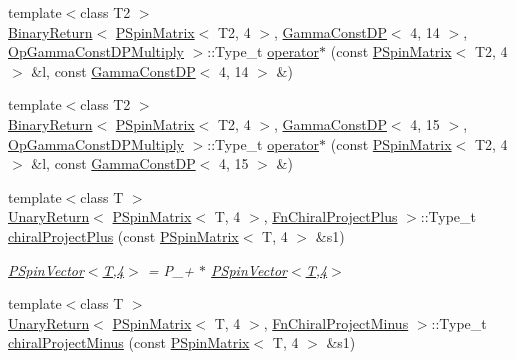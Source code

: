 \begin{DoxyCompactItemize}
\item 
{\footnotesize template$<$class T2 $>$ }\\\mbox{\hyperlink{structENSEM_1_1BinaryReturn}{Binary\+Return}}$<$ \mbox{\hyperlink{classENSEM_1_1PSpinMatrix}{P\+Spin\+Matrix}}$<$ T2, 4 $>$, \mbox{\hyperlink{classENSEM_1_1GammaConstDP}{Gamma\+Const\+DP}}$<$ 4, 14 $>$, \mbox{\hyperlink{structENSEM_1_1OpGammaConstDPMultiply}{Op\+Gamma\+Const\+D\+P\+Multiply}} $>$\+::Type\+\_\+t \mbox{\hyperlink{group__primspinmatrix_ga701841ed0546a547ae068731f72d9054}{operator$\ast$}} (const \mbox{\hyperlink{classENSEM_1_1PSpinMatrix}{P\+Spin\+Matrix}}$<$ T2, 4 $>$ \&l, const \mbox{\hyperlink{classENSEM_1_1GammaConstDP}{Gamma\+Const\+DP}}$<$ 4, 14 $>$ \&)
\item 
{\footnotesize template$<$class T2 $>$ }\\\mbox{\hyperlink{structENSEM_1_1BinaryReturn}{Binary\+Return}}$<$ \mbox{\hyperlink{classENSEM_1_1PSpinMatrix}{P\+Spin\+Matrix}}$<$ T2, 4 $>$, \mbox{\hyperlink{classENSEM_1_1GammaConstDP}{Gamma\+Const\+DP}}$<$ 4, 15 $>$, \mbox{\hyperlink{structENSEM_1_1OpGammaConstDPMultiply}{Op\+Gamma\+Const\+D\+P\+Multiply}} $>$\+::Type\+\_\+t \mbox{\hyperlink{group__primspinmatrix_ga06378dd69a5d2daf15d11b69a3f42acd}{operator$\ast$}} (const \mbox{\hyperlink{classENSEM_1_1PSpinMatrix}{P\+Spin\+Matrix}}$<$ T2, 4 $>$ \&l, const \mbox{\hyperlink{classENSEM_1_1GammaConstDP}{Gamma\+Const\+DP}}$<$ 4, 15 $>$ \&)
\item 
{\footnotesize template$<$class T $>$ }\\\mbox{\hyperlink{structENSEM_1_1UnaryReturn}{Unary\+Return}}$<$ \mbox{\hyperlink{classENSEM_1_1PSpinMatrix}{P\+Spin\+Matrix}}$<$ T, 4 $>$, \mbox{\hyperlink{structENSEM_1_1FnChiralProjectPlus}{Fn\+Chiral\+Project\+Plus}} $>$\+::Type\+\_\+t \mbox{\hyperlink{group__primspinmatrix_ga6005e8f3442735f70e74a218c3d5a141}{chiral\+Project\+Plus}} (const \mbox{\hyperlink{classENSEM_1_1PSpinMatrix}{P\+Spin\+Matrix}}$<$ T, 4 $>$ \&s1)
\begin{DoxyCompactList}\small\item\em \mbox{\hyperlink{classENSEM_1_1PSpinVector_3_01T_00_014_01_4}{P\+Spin\+Vector$<$\+T,4$>$}} = P\+\_\++ $\ast$ \mbox{\hyperlink{classENSEM_1_1PSpinVector_3_01T_00_014_01_4}{P\+Spin\+Vector$<$\+T,4$>$}} \end{DoxyCompactList}\item 
{\footnotesize template$<$class T $>$ }\\\mbox{\hyperlink{structENSEM_1_1UnaryReturn}{Unary\+Return}}$<$ \mbox{\hyperlink{classENSEM_1_1PSpinMatrix}{P\+Spin\+Matrix}}$<$ T, 4 $>$, \mbox{\hyperlink{structENSEM_1_1FnChiralProjectMinus}{Fn\+Chiral\+Project\+Minus}} $>$\+::Type\+\_\+t \mbox{\hyperlink{group__primspinmatrix_ga6f9b4b2c70376b17548850f503a8c393}{chiral\+Project\+Minus}} (const \mbox{\hyperlink{classENSEM_1_1PSpinMatrix}{P\+Spin\+Matrix}}$<$ T, 4 $>$ \&s1)

\end{DoxyCompactItemize}

